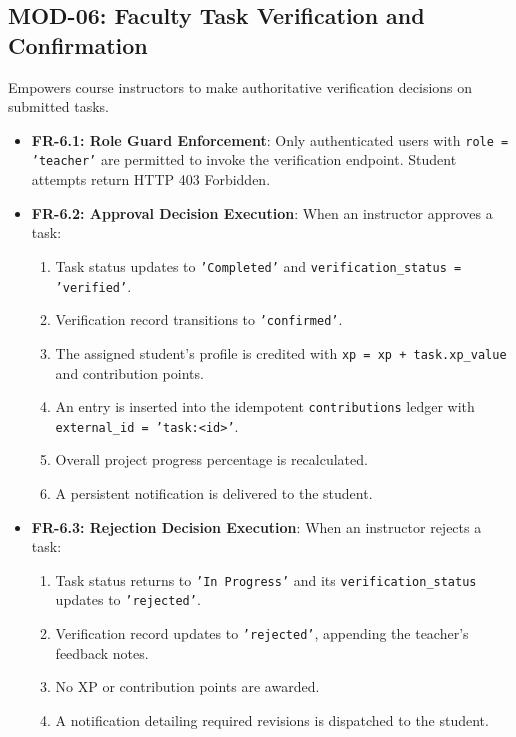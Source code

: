 \documentclass{scrreprt}
\begin{document}
\subsection{MOD-06: Faculty Task Verification and Confirmation}
Empowers course instructors to make authoritative verification decisions on submitted tasks.
\begin{itemize}
    \item \textbf{FR-6.1: Role Guard Enforcement}: Only authenticated users with \texttt{role = 'teacher'} are permitted to invoke the verification endpoint. Student attempts return HTTP 403 Forbidden.
    \item \textbf{FR-6.2: Approval Decision Execution}: When an instructor approves a task:
    \begin{enumerate}
        \item Task status updates to \texttt{'Completed'} and \texttt{verification\_status = 'verified'}.
        \item Verification record transitions to \texttt{'confirmed'}.
        \item The assigned student's profile is credited with \texttt{xp = xp + task.xp\_value} and contribution points.
        \item An entry is inserted into the idempotent \texttt{contributions} ledger with \texttt{external\_id = 'task:<id>'}.
        \item Overall project progress percentage is recalculated.
        \item A persistent notification is delivered to the student.
    \end{enumerate}
    \item \textbf{FR-6.3: Rejection Decision Execution}: When an instructor rejects a task:
    \begin{enumerate}
        \item Task status returns to \texttt{'In Progress'} and its \texttt{verification\_status} updates to \texttt{'rejected'}.
        \item Verification record updates to \texttt{'rejected'}, appending the teacher's feedback notes.
        \item No XP or contribution points are awarded.
        \item A notification detailing required revisions is dispatched to the student.
    \end{enumerate}
\end{itemize}
\end{document}
